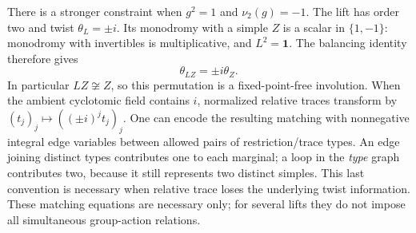 There is a stronger constraint when $g^2=1$ and $\nu_2(g)=-1$.
The lift has order two and twist $\theta_L=\pm i$. Its monodromy with a
simple $Z$ is a scalar in $\{1,-1\}$: monodromy with invertibles is
multiplicative, and $L^2=\mathbf1$. The balancing identity therefore gives
\[
 \theta_{LZ}=\pm i\theta_Z.
\]
In particular $LZ\not\cong Z$, so this permutation is a fixed-point-free
involution. When the ambient cyclotomic field contains $i$, normalized
relative traces transform by
$(t_j)_j\mapsto((\pm i)^j t_j)_j$.
One can encode the resulting matching with nonnegative integral edge
variables between allowed pairs of restriction/trace types. An edge
joining distinct types contributes one to each marginal; a loop in the
\emph{type} graph contributes two, because it still represents two distinct
simples. This last convention is necessary when relative trace loses the
underlying twist information. These matching equations are necessary only;
for several lifts they do not impose all simultaneous group-action
relations.

